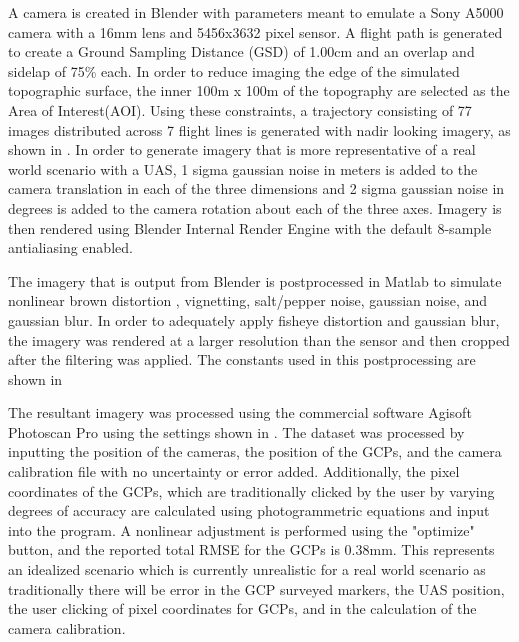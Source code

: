 

A camera is created in Blender with parameters meant to emulate a Sony A5000 camera with a 16mm lens and 5456x3632 pixel sensor.  A flight path is generated to create a Ground Sampling Distance (GSD) of 1.00cm and an overlap and sidelap of 75\% each.  In order to reduce imaging the edge of the simulated topographic surface, the inner 100m x 100m of the topography are selected as the Area of Interest(AOI).  Using these constraints, a trajectory consisting of 77 images distributed across 7 flight lines is generated with nadir looking imagery, as shown in .  In order to generate imagery that is more representative of a real world scenario with a UAS, 1 sigma gaussian noise in meters is added to the camera translation in each of the three dimensions and 2 sigma gaussian noise in degrees is added to the camera rotation about each of the three axes.  Imagery is then rendered using Blender Internal Render Engine with the default 8-sample antialiasing enabled.  



The imagery that is output from Blender is postprocessed in Matlab to simulate nonlinear brown distortion , vignetting, salt/pepper noise, gaussian noise, and gaussian blur.  In order to adequately apply fisheye distortion and gaussian blur, the imagery was rendered at a larger resolution than the sensor and then cropped after the filtering was applied.  The constants used in this postprocessing are shown in   




%
The resultant imagery was processed using the commercial software Agisoft Photoscan Pro using the settings shown in .  The dataset was processed by inputting the position of the cameras, the position of the GCPs, and the camera calibration file with no uncertainty or error added.  Additionally, the pixel coordinates of the GCPs, which are traditionally clicked by the user by varying degrees of accuracy are calculated using photogrammetric equations and input into the program.  A nonlinear adjustment is performed using the "optimize" button, and the reported total RMSE for the GCPs is 0.38mm.  This represents an idealized scenario which is currently unrealistic for a real world scenario as traditionally there will be error in the GCP surveyed markers, the UAS position, the user clicking of pixel coordinates for GCPs, and in the calculation of the camera calibration.  

